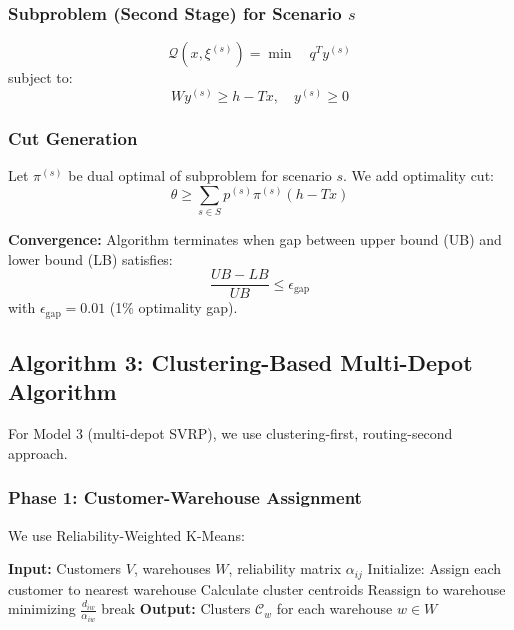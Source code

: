 \subsubsection{Subproblem (Second Stage) for Scenario $s$}

\begin{equation}
\mathcal{Q}(x, \xi^{(s)}) = \min \quad q^T y^{(s)}
\end{equation}
subject to:
\begin{equation}
Wy^{(s)} \geq h - Tx, \quad y^{(s)} \geq 0
\end{equation}

\subsubsection{Cut Generation}

Let $\pi^{(s)}$ be dual optimal of subproblem for scenario $s$. We add optimality cut:
\begin{equation}
\theta \geq \sum_{s \in S} p^{(s)} \pi^{(s)} (h - Tx)
\end{equation}

\textbf{Convergence:} Algorithm terminates when gap between upper bound (UB) and lower bound (LB) satisfies:
\begin{equation}
\frac{UB - LB}{UB} \leq \epsilon_{\text{gap}}
\end{equation}
with $\epsilon_{\text{gap}} = 0.01$ (1\% optimality gap).

\subsection{Algorithm 3: Clustering-Based Multi-Depot Algorithm}

For Model 3 (multi-depot SVRP), we use clustering-first, routing-second approach.

\subsubsection{Phase 1: Customer-Warehouse Assignment}

We use Reliability-Weighted K-Means:

\begin{algorithm}[H]
\caption{Reliability-Weighted Clustering}
\begin{algorithmic}[1]
\STATE \textbf{Input:} Customers $V$, warehouses $W$, reliability matrix $\alpha_{ij}$
\STATE Initialize: Assign each customer to nearest warehouse
\STATE Calculate cluster centroids
\STATE Reassign to warehouse minimizing $\frac{d_{iw}}{\alpha_{iw}}$
\ENDFOR
{}
\STATE break
\ENDIF
\ENDFOR
\STATE \textbf{Output:} Clusters $\mathcal{C}_w$ for each warehouse $w \in W$
\end{algorithmic}
\end{algorithm}

